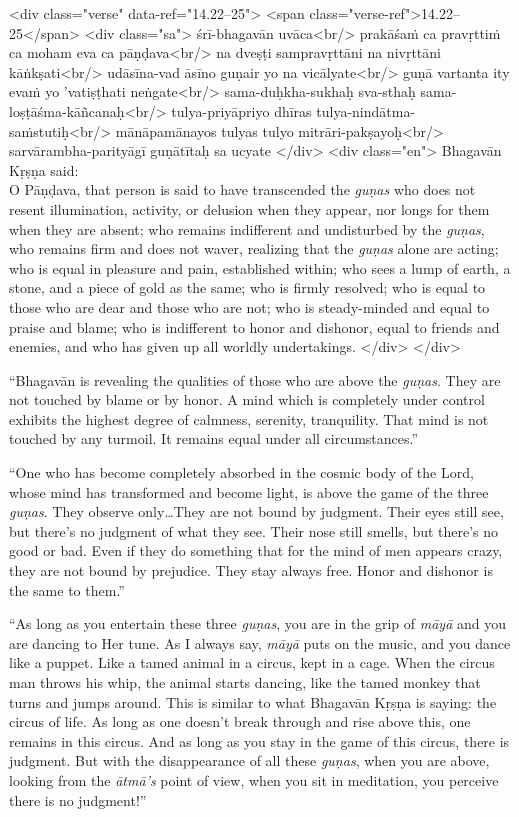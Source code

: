 \begin{html}
<div class="verse" data-ref="14.22–25">
  <span class="verse-ref">14.22–25</span>
  <div class="sa">
    śrī-bhagavān uvāca<br/>
    prakāśaṁ ca pravṛttiṁ ca moham eva ca pāṇḍava<br/>
    na dveṣṭi sampravṛttāni na nivṛttāni kāṅkṣati<br/>
    udāsīna-vad āsīno guṇair yo na vicālyate<br/>
    guṇā vartanta ity evaṁ yo ’vatiṣṭhati neṅgate<br/>
    sama-duḥkha-sukhaḥ sva-sthaḥ sama-loṣṭāśma-kāñcanaḥ<br/>
    tulya-priyāpriyo dhīras tulya-nindātma-saṁstutiḥ<br/>
    mānāpamānayos tulyas tulyo mitrāri-pakṣayoḥ<br/>
    sarvārambha-parityāgī guṇātītaḥ sa ucyate
  </div>
  <div class="en">
    \hspace*{1em}Bhagavān Kṛṣṇa said: \\ O Pāṇḍava, that person is said to have transcended the \textit{guṇas} who does not resent illumination, activity, or delusion when they appear, nor longs for them when they are absent; who remains indifferent and undisturbed by the \textit{guṇas}, who remains firm and does not waver, realizing that the \textit{guṇas} alone are acting; who is equal in pleasure and pain, established within; who sees a lump of earth, a stone, and a piece of gold as the same; who is firmly resolved; who is equal to those who are dear and those who are not; who is steady-minded and equal to praise and blame; who is indifferent to honor and dishonor, equal to friends and enemies, and who has given up all worldly undertakings.
  </div>
</div>
\end{html}



\enquote{Bhagavān is revealing the qualities of those who are above the \textit{guṇas}. They are not touched by blame or by honor. A mind which is completely under control exhibits the highest degree of calmness, serenity, tranquility. That mind is not touched by any turmoil. It remains equal under all circumstances.}

\enquote{One who has become completely absorbed in the cosmic body of the Lord, whose mind has transformed and become light, is above the game of the three \textit{guṇas}. They observe only\ldots They are not bound by judgment. Their eyes still see, but there’s no judgment of what they see. Their nose still smells, but there’s no good or bad. Even if they do something that for the mind of men appears crazy, they are not bound by prejudice. They stay always free. Honor and dishonor is the same to them.}

\enquote{As long as you entertain these three \textit{guṇas}, you are in the grip of \textit{māyā} and you are dancing to Her tune. As I always say, \textit{māyā} puts on the music, and you dance like a puppet. Like a tamed animal in a circus, kept in a cage. When the circus man throws his whip, the animal starts dancing, like the tamed monkey that turns and jumps around. This is similar to what Bhagavān Kṛṣṇa is saying: the circus of life. As long as one doesn’t break through and rise above this, one remains in this circus. And as long as you stay in the game of this circus, there is judgment. But with the disappearance of all these \textit{guṇas}, when you are above, looking from the \textit{ātmā’s} point of view, when you sit in meditation, you perceive there is no judgment!}


